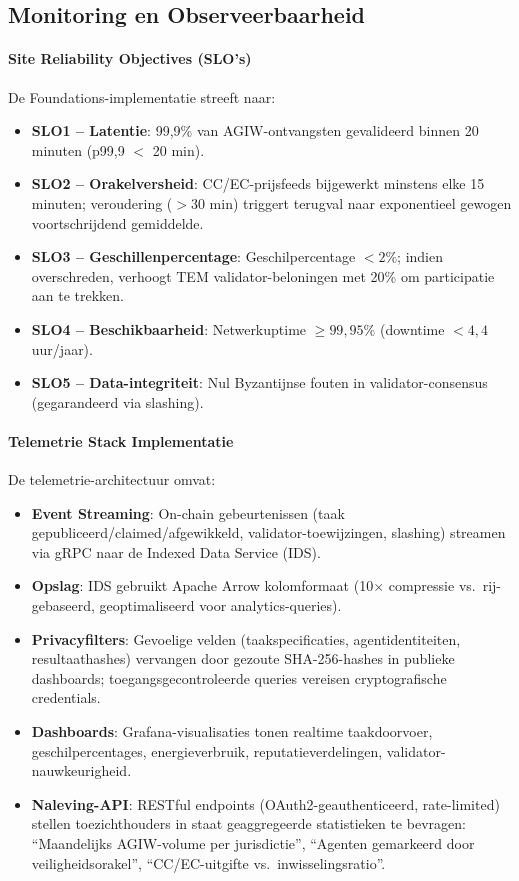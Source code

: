 \documentclass[11pt]{article}
\begin{document}
\subsection{Monitoring en Observeerbaarheid}
\paragraph{Site Reliability Objectives (SLO's)} De Foundations-implementatie streeft naar:
\begin{itemize}[noitemsep]
  \item \textbf{SLO1 -- Latentie}: 99,9\% van AGIW-ontvangsten gevalideerd binnen 20 minuten (p99,9 $<$ 20 min).
  \item \textbf{SLO2 -- Orakelversheid}: CC/EC-prijsfeeds bijgewerkt minstens elke 15 minuten; veroudering ($>30$ min) triggert terugval naar exponentieel gewogen voortschrijdend gemiddelde.
  \item \textbf{SLO3 -- Geschillenpercentage}: Geschilpercentage $<2\%$; indien overschreden, verhoogt TEM validator-beloningen met 20\% om participatie aan te trekken.
  \item \textbf{SLO4 -- Beschikbaarheid}: Netwerkuptime $\geq 99,95\%$ (downtime $<4,4$ uur/jaar).
  \item \textbf{SLO5 -- Data-integriteit}: Nul Byzantijnse fouten in validator-consensus (gegarandeerd via slashing).
\end{itemize}

\paragraph{Telemetrie Stack Implementatie} De telemetrie-architectuur omvat:
\begin{itemize}[noitemsep]
  \item \textbf{Event Streaming}: On-chain gebeurtenissen (taak gepubliceerd/claimed/afgewikkeld, validator-toewijzingen, slashing) streamen via gRPC naar de Indexed Data Service (IDS).
  \item \textbf{Opslag}: IDS gebruikt Apache Arrow kolomformaat (10$\times$ compressie vs.\ rij-gebaseerd, geoptimaliseerd voor analytics-queries).
  \item \textbf{Privacyfilters}: Gevoelige velden (taakspecificaties, agentidentiteiten, resultaathashes) vervangen door gezoute SHA-256-hashes in publieke dashboards; toegangsgecontroleerde queries vereisen cryptografische credentials.
  \item \textbf{Dashboards}: Grafana-visualisaties tonen realtime taakdoorvoer, geschilpercentages, energieverbruik, reputatieverdelingen, validator-nauwkeurigheid.
  \item \textbf{Naleving-API}: RESTful endpoints (OAuth2-geauthenticeerd, rate-limited) stellen toezichthouders in staat geaggregeerde statistieken te bevragen: ``Maandelijks AGIW-volume per jurisdictie'', ``Agenten gemarkeerd door veiligheidsorakel'', ``CC/EC-uitgifte vs.\ inwisselingsratio''.
\end{itemize}
\end{document}
